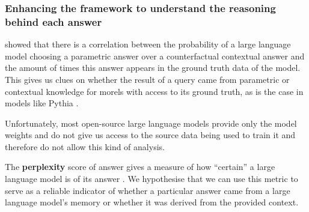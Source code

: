 
\subsubsection{Enhancing the framework to understand the reasoning behind each answer}

 showed that there is a correlation between the probability of a large language model choosing a parametric answer over a counterfactual contextual answer and the amount of times this answer appears in the ground truth data of the model.
This gives us clues on whether the result of a query came from parametric or contextual knowledge for morels with access to its ground truth, as is the case in models like Pythia \citep{pythia}.

Unfortunately, most open-source large language models provide only the model weights and do not give us access to the source data being used to train it and therefore do not allow this kind of analysis.

The \textbf{perplexity} score of answer gives a measure of how ``certain'' a large language model is of its answer \citep{how_can_we_know}.
We hypothesise that we can use this metric to serve as a reliable indicator of whether a particular answer came from a large language model's memory or whether it was derived from the provided context.
